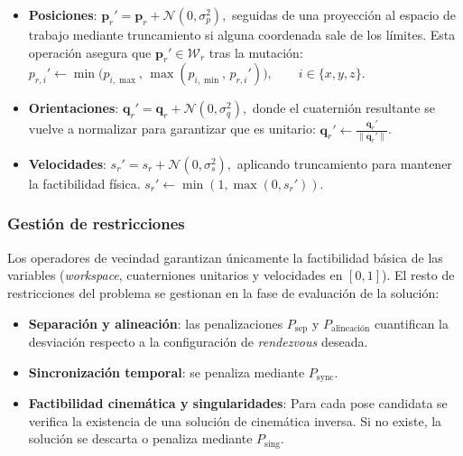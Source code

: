 \begin{itemize}
    \item \textbf{Posiciones}: 
    $\mathbf{p}_r' = \mathbf{p}_r + \mathcal{N}(0,\sigma_p^2),$
    seguidas de una proyección al espacio de trabajo mediante truncamiento si alguna coordenada sale de los límites. 
    Esta operación asegura que $\mathbf{p}_r' \in \mathcal{W}_r$ tras la mutación:
    $p_{r,i}' \leftarrow 
    \min\big(p_{i,\max},\, \max(p_{i,\min},\, p_{r,i}')\big),
    \qquad i \in \{x,y,z\}.
    $
    
    \item \textbf{Orientaciones}:
    $\mathbf{q}_r' = \mathbf{q}_r + \mathcal{N}(0,\sigma_q^2),$
    donde el cuaternión resultante se vuelve a normalizar para garantizar que es unitario:
    $\mathbf{q}_r' \leftarrow \frac{\mathbf{q}_r'}{\|\mathbf{q}_r'\|}$.

    \item \textbf{Velocidades}:
    $
    s_r' = s_r + \mathcal{N}(0,\sigma_s^2),$ aplicando truncamiento para mantener la factibilidad física.
    $s_r' \leftarrow \min(1,\max(0,s_r'))$.
\end{itemize}

\subsubsection*{Gestión de restricciones}

Los operadores de vecindad garantizan únicamente la factibilidad básica de las
variables (\textit{workspace}, cuaterniones unitarios y velocidades en $[0,1]$). El resto
de restricciones del problema se gestionan en
la fase de evaluación de la solución:
\begin{itemize}
    \item \textbf{Separación y alineación}:  
    las penalizaciones $P_{\text{sep}}$ y $P_{\text{alineación}}$ cuantifican la
    desviación respecto a la configuración de \textit{rendezvous} deseada.

    \item \textbf{Sincronización temporal}:  
    se penaliza mediante $P_{\text{sync}}$.

    \item \textbf{Factibilidad cinemática y singularidades}:  
    Para cada pose candidata se verifica la existencia de una solución de
    cinemática inversa. Si no existe, la solución se descarta o penaliza mediante $P_{\text{sing}}$.  
\end{itemize}

